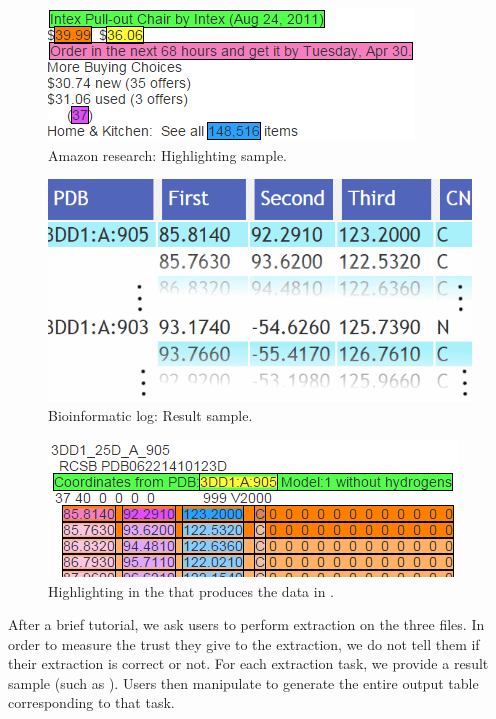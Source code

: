 \begin{figure}[t]
    \centering
    \includegraphics[width=0.6\columnwidth]{figures/amazon}
    \caption{Amazon research: Highlighting sample.}
    \label{fig:interactive:evaluation:amazonsample}
\end{figure}

\begin{figure}[t]
    \centering
    \includegraphics[width=0.6\columnwidth]{figures/hinthydrogens}
    \caption{Bioinformatic log: Result sample.}
    \label{fig:interactive:evaluation:biosample}
\end{figure}

\begin{figure}[t]
    \centering
    \includegraphics[width=0.7\columnwidth]{figures/hydrogenhybrid}
    \caption{Highlighting in the \InputTextView that produces the data in .}
    \label{fig:interactive:evaluation:highlighting}
\end{figure}

After a brief tutorial, we ask users to perform extraction on the three files.
In order to measure the trust they give to the extraction, we do not tell them if their extraction is correct or not.
For each extraction task, we provide a result sample (such as ).
Users then manipulate \FlashProg to generate the entire output table corresponding to that task.

